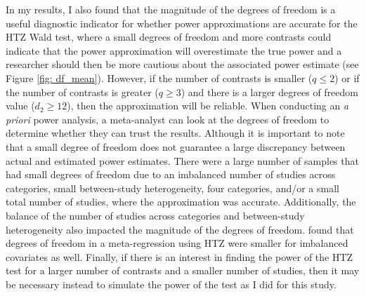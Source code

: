 In my results, I also found that the magnitude of the degrees of freedom is a useful diagnostic indicator for whether power approximations are accurate for the HTZ Wald test, where a small degrees of freedom and more contrasts could indicate that the power approximation will overestimate the true power and a researcher should then be more cautious about the associated power estimate (see Figure \ref{fig: df_mean}). However, if the number of contrasts is smaller ($q \leq 2$) or if the number of contrasts is greater ($q \geq 3$) and there is a larger degrees of freedom value ($d_2 \geq 12$), then the approximation will be reliable. When conducting an \textit{a priori} power analysis, a meta-analyst can look at the degrees of freedom to determine whether they can trust the results. Although it is important to note that a small degree of freedom does not guarantee a large discrepancy between actual and estimated power estimates. There were a large number of samples that had small degrees of freedom due to an imbalanced number of studies across categories, small between-study heterogeneity, four categories, and/or a small total number of studies, where the approximation was accurate. Additionally, the balance of the number of studies across categories and between-study heterogeneity also impacted the magnitude of the degrees of freedom. \textcite{tipton2015b} found that degrees of freedom in a meta-regression using HTZ were smaller for imbalanced covariates as well. Finally, if there is an interest in finding the power of the HTZ test for a larger number of contrasts and a smaller number of studies, then it may be necessary instead to simulate the power of the test as I did for this study. 



